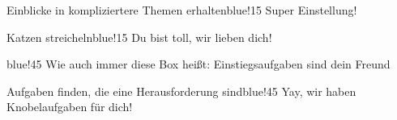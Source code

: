 \documentclass[../main.tex]{subfiles}
\begin{document}
\begin{goal}{Einblicke in kompliziertere Themen erhalten}{blue!15}
    Super Einstellung!
\end{goal}

\begin{goal}{Katzen streicheln}{blue!15}
    Du bist toll, wir lieben dich!
\end{goal}

\begin{goal}{}{blue!45}
    Wie auch immer diese Box heißt: Einstiegsaufgaben sind dein Freund
\end{goal}

\begin{goal}{Aufgaben finden, die eine Herausforderung sind}{blue!45}
    Yay, wir haben Knobelaufgaben für dich!
\end{goal}
\end{document}
